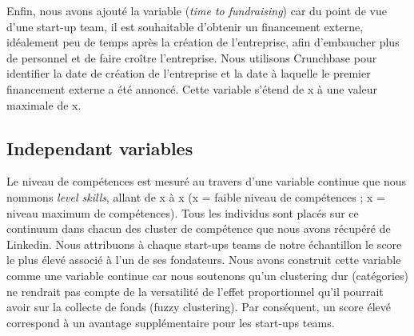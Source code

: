 \documentclass[12pt]{article}
\begin{document}
Enfin, nous avons ajouté la variable (\textit{time to fundraising}) car du point de vue d'une start-up team, il est souhaitable d'obtenir un financement externe, idéalement peu de temps après la création de l'entreprise, afin d'embaucher plus de personnel et de faire croître l'entreprise. Nous utilisons Crunchbase pour identifier la date de création de l'entreprise et la date à laquelle le premier financement externe a été annoncé. Cette variable s'étend de x à une valeur maximale de x.

\subsection{Independant variables}

Le niveau de compétences est mesuré au travers d'une variable continue que nous nommons \textit{level skills}, allant de x à x (x = faible niveau de compétences ; x = niveau maximum de compétences). Tous les individus sont placés sur ce continuum dans chacun des cluster de compétence que nous avons récupéré de Linkedin. Nous attribuons à chaque start-ups teams de notre échantillon le score le plus élevé associé à l'un de ses fondateurs. Nous avons construit cette variable comme une variable continue car nous soutenons qu'un clustering dur (catégories) ne rendrait pas compte de la versatilité de l'effet proportionnel qu'il pourrait avoir sur la collecte de fonds (fuzzy clustering). Par conséquent, un score élevé correspond à un avantage supplémentaire pour les start-ups teams.
\end{document}
